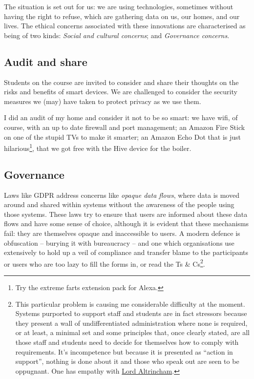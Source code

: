 \documentclass[
]{book}
\begin{document}
The situation is set out for us: we are using technologies, sometimes without having the right to refuse, which are gathering data on us, our homes, and our lives. The ethical concerns associated with these innovations are characterised as being of two kinds: \emph{Social and cultural concerns}; and \emph{Governance concerns}.

\hypertarget{audit-and-share}{%
\subsection{Audit and share}\label{audit-and-share}}

Students on the course are invited to consider and share their thoughts on the risks and benefits of smart devices. We are challenged to consider the security measures we (may) have taken to protect privacy as we use them.

I did an audit of my home and consider it not to be so smart: we have wifi, of course, with an up to date firewall and port management; an Amazon Fire Stick on one of the stupid TVs to make it smarter; an Amazon Echo Dot that is just hilarious\footnote{Try the extreme farts extension pack for Alexa.}, that we got free with the Hive device for the boiler.

\hypertarget{governance}{%
\subsection{Governance}\label{governance}}

Laws like GDPR address concerns like \emph{opaque data flows}, where data is moved around and shared within systems without the awareness of the people using those systems. These laws try to ensure that users are informed about these data flows and have some sense of choice, although it is evident that these mechanisms fail: they are themselves opaque and inaccessible to users. A modern defence is obfuscation -- burying it with bureaucracy -- and one which organisations use extensively to hold up a veil of compliance and transfer blame to the participants or users who are too lazy to fill the forms in, or read the Ts \& Cs\footnote{This particular problem is causing me considerable difficulty at the moment. Systems purported to support staff and students are in fact stressors because they present a wall of undifferentiated administration where none is required, or at least, a minimal set and some principles that, once clearly stated, are all those staff and students need to decide for themselves how to comply with requirements. It's incompetence but because it is presented as ``action in support'', nothing is done about it and those who speak out are seen to be oppugnant. One has empathy with \href{https://en.wikipedia.org/wiki/John_Grigg_(writer)}{Lord Altrincham}.}.
\end{document}
